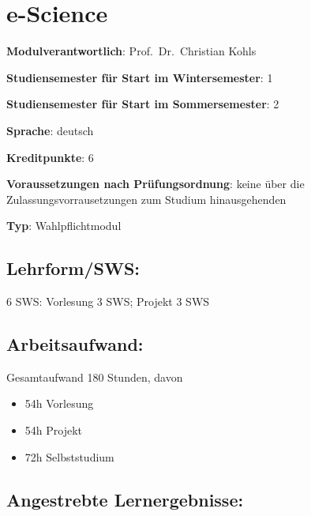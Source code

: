 \chapter{e-Science}\label{e-science}

\begin{modulHead}
\textbf{Modulverantwortlich}: Prof.~Dr.~Christian
Kohls
\end{modulHead}
\begin{modulHead}
\textbf{Studiensemester für
Start im Wintersemester}:
1
\end{modulHead}
\begin{modulHead}
\textbf{Studiensemester für Start
im Sommersemester}:
2
\end{modulHead}
\begin{modulHead}
\textbf{Sprache}:
deutsch
\end{modulHead}
\begin{modulHead}
\textbf{Kreditpunkte}:
6
\end{modulHead}
\begin{modulHead}
\textbf{Voraussetzungen nach
Prüfungsordnung}: keine über die Zulassungsvorrausetzungen zum Studium
hinausgehenden
\end{modulHead}
\begin{modulHead}
\textbf{Typ}:
Wahlpflichtmodul
\end{modulHead}


\section*{Lehrform/SWS:}\label{lehrformsws-14}

6 SWS: Vorlesung 3 SWS; Projekt 3 SWS

\section*{Arbeitsaufwand:}\label{arbeitsaufwand-15}

Gesamtaufwand 180 Stunden, davon

\begin{itemize}
\tightlist
\item
  54h Vorlesung
\item
  54h Projekt
\item
  72h Selbststudium
\end{itemize}

\section*{Angestrebte
Lernergebnisse:}\label{angestrebte-lernergebnisse-14}

